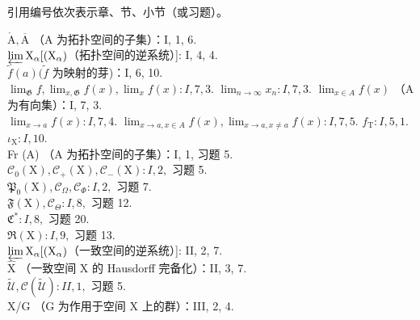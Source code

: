 
引用编号依次表示章、节、小节（或习题）。

\(\mathring{\mathrm{A}}, \overline{\mathrm{A}}\) （A 为拓扑空间的子集）：I, 1, 6.\\
\(\varprojlim \mathrm{X}_{\alpha}[(\mathrm{X}_{\alpha})\)（拓扑空间的逆系统）{]}: I, 4, 4.\\
\(\tilde{f}(a) (\tilde{f}\) 为映射的芽)：I, 6, 10.\\
\(\lim_{\mathfrak{G}} f, \lim_{x, \mathfrak{G}} f(x), \lim_{x} f(x): I, 7, 3.\) \(\lim_{n \to \infty} x_n: I, 7, 3.\) \(\lim_{x \in A} f(x)\) （A 为有向集）：I, 7, 3.\\
\(\lim_{x \to a} f(x): I, 7, 4.\) \(\lim_{x \to a, x \in A} f(x), \lim_{x \to a, x \neq a} f(x): I, 7, 5.\) \(f_{\mathrm{T}}: I, 5, 1.\) \(\iota_{\mathrm{X}}: I, 10.\)\\
Fr (A) （A 为拓扑空间的子集）：I, 1, 习题 5.\\
\(\mathcal{C}_0(\mathrm{X}), \mathcal{C}_+(\mathrm{X}), \mathcal{C}_-(\mathrm{X}): I, 2,\) 习题 5.\\
\(\mathfrak{P}_0(\mathrm{X}), \mathcal{C}_\Omega, \mathcal{C}_\Phi: I, 2,\) 习题 7.\\
\(\mathfrak{F}(\mathrm{X}), \mathcal{C}_\Theta: I, 8,\) 习题 12.\\
\(\mathfrak{C}^*: I, 8,\) 习题 20.\\
\(\mathfrak{R}(\mathrm{X}): I, 9,\) 习题 13.\\
\(\varprojlim \mathrm{X}_{\alpha}[(\mathrm{X}_{\alpha})\)（一致空间的逆系统）{]}: II, 2, 7.\\
\(\hat{\mathrm{X}}\) （一致空间 X 的 Hausdorff 完备化）：II, 3, 7.\\
\(\tilde{\mathcal{U}}, \mathcal{C}(\tilde{\mathcal{U}}): II, 1,\) 习题 5.\\
X/G （G 为作用于空间 X 上的群）：III, 2, 4.

